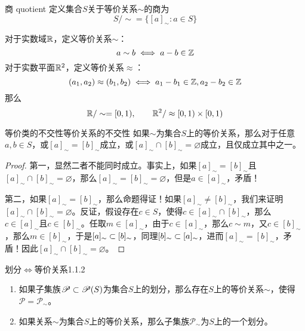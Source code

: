 \begin{definition}{商 quotient}
	定义集合$S$关于等价关系$\sim$的商为
	$$
	S/\sim=\{ [a]_\sim:a\in S \}
	$$
\end{definition}

\begin{example}
	对于实数域$\mathbb{R}$，定义等价关系$\sim$：
	$$
	a\sim b\iff a-b\in\mathbb{Z}
	$$
	对于实数平面$\mathbb{R}^2$，定义等价关系$\approx$：
	$$
	(a_1,a_2)\approx(b_1,b_2)\iff
	a_1-b_1\in\mathbb{Z},a_2-b_2\in\mathbb{Z}
	$$
	那么
	$$
	\mathbb{R}/\sim=[0,1),\qquad \mathbb{R}^2/\approx [0,1)\times[0,1)
	$$
\end{example}

\begin{theorem}{等价类的不交性}{等价关系的不交性}
	如果$\sim$为集合$S$上的等价关系，那么对于任意$a,b\in S$，或$[a]_\sim=[b]_\sim$成立，或$[a]_\sim\cap [b]_\sim=\varnothing$成立，且仅成立其中之一。
\end{theorem}

\begin{proof}
	第一，显然二者不能同时成立。事实上，如果$[a]_\sim=[b]_\sim$且$[a]_\sim\cap [b]_\sim=\varnothing$，那么$[a]_\sim=[b]_\sim=\varnothing$，但是$a\in[a]_\sim$，矛盾！
	
	第二，如果$[a]_\sim=[b]_\sim$，那么命题得证！如果$[a]_\sim\ne[b]_\sim$，我们来证明$[a]_\sim\cap [b]_\sim=\varnothing$。反证，假设存在$c\in S$，使得$c\in [a]_\sim\cap[b]_\sim$，那么$c\in [a]_\sim$且$c\in [b]_\sim$。任取$m\in[a]_\sim$，由于$c\in [a]_\sim$，那么$c\sim m$，又$c\in [b]_\sim$，那么$m\in [b]_\sim$，于是$[a]_\sim\subset[b]_\sim$，同理$[b]_\sim\subset[a]_\sim$，进而$[a]_\sim=[b]_\sim$，矛盾！因此$[a]_\sim\cap [b]_\sim=\varnothing$。
\end{proof}

\begin{theorem}{划分$\iff$等价关系}{1.1.2}
	\begin{enumerate}
		\item 如果子集族$\mathscr{P}\subset \mathscr{P}(S)$为集合$S$上的划分，那么存在$S$上的等价关系$\sim$，使得$\mathscr{P}=\mathscr{P}_\sim$。
		\item 如果关系$\sim$为集合$S$上的等价关系，那么子集族$\mathscr{P}_\sim$为$S$上的一个划分。
	\end{enumerate}
\end{theorem}


